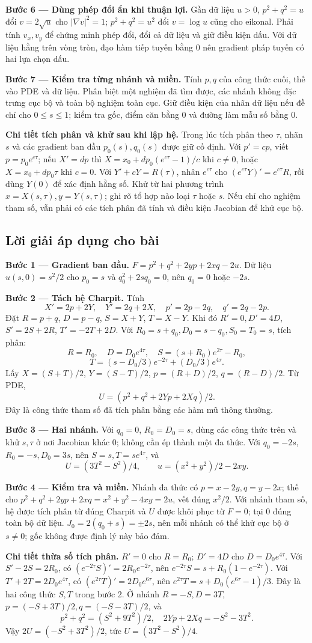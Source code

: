 \documentclass[10pt,a4paper]{article}
\begin{document}
\textbf{Bước 6 — Dùng phép đổi ẩn khi thuận lợi.} Gần dữ liệu $u>0$, $p^2+q^2=u$ đổi $v=2\sqrt u$ cho $|\nabla v|^2=1$; $p^2+q^2=u^2$ đổi $v=\log u$ cũng cho eikonal. Phải tính $v_x,v_y$ để chứng minh phép đổi, đổi cả dữ liệu và giữ điều kiện dấu. Với dữ liệu hằng trên vòng tròn, đạo hàm tiếp tuyến bằng 0 nên gradient pháp tuyến có hai lựa chọn dấu.

\textbf{Bước 7 — Kiểm tra từng nhánh và miền.} Tính $p,q$ của công thức cuối, thế vào PDE và dữ liệu. Phân biệt một nghiệm đã tìm được, các nhánh không đặc trưng cục bộ và toàn bộ nghiệm toàn cục. Giữ điều kiện của nhãn dữ liệu nếu đề chỉ cho $0\le s\le1$; kiểm tra gốc, điểm căn bằng 0 và đường làm mẫu số bằng 0.

\textbf{Chi tiết tích phân và khử sau khi lập hệ.} Trong lúc tích phân theo $\tau$, nhãn $s$ và các gradient ban đầu $p_0(s),q_0(s)$ được giữ cố định. Với $p'=cp$, viết $p=p_0e^{c\tau}$; nếu $X'=dp$ thì $X=x_0+dp_0(e^{c\tau}-1)/c$ khi $c\ne0$, hoặc $X=x_0+dp_0\tau$ khi $c=0$. Với $Y'+cY=R(\tau)$, nhân $e^{c\tau}$ cho $(e^{c\tau}Y)'=e^{c\tau}R$, rồi dùng $Y(0)$ để xác định hằng số. Khử từ hai phương trình $x=X(s,\tau),y=Y(s,\tau)$; ghi rõ tổ hợp nào loại $\tau$ hoặc $s$. Nếu chỉ cho nghiệm tham số, vẫn phải có các tích phân đã tính và điều kiện Jacobian để khử cục bộ.
\subsection*{Lời giải áp dụng cho bài}
\textbf{Bước 1 — Gradient ban đầu.} $F=p^2+q^2+2yp+2xq-2u$. Dữ liệu $u(s,0)=s^2/2$ cho $p_0=s$ và $q_0^2+2sq_0=0$, nên $q_0=0$ hoặc $-2s$.

\textbf{Bước 2 — Tách hệ Charpit.} Tính
\[X'=2p+2Y,\quad Y'=2q+2X,\quad p'=2p-2q,\quad q'=2q-2p.\]
Đặt $R=p+q$, $D=p-q$, $S=X+Y$, $T=X-Y$. Khi đó $R'=0,D'=4D$, $S'=2S+2R$, $T'=-2T+2D$. Với $R_0=s+q_0,D_0=s-q_0,S_0=T_0=s$, tích phân:
\[R=R_0,\quad D=D_0e^{4\tau},\quad S=(s+R_0)e^{2\tau}-R_0,\]
\[T=(s-D_0/3)e^{-2\tau}+(D_0/3)e^{4\tau}.\]
Lấy $X=(S+T)/2$, $Y=(S-T)/2$, $p=(R+D)/2$, $q=(R-D)/2$. Từ PDE,
\[U=(p^2+q^2+2Yp+2Xq)/2.\]
Đây là công thức tham số đã tích phân bằng các hàm mũ thông thường.

\textbf{Bước 3 — Hai nhánh.} Với $q_0=0$, $R_0=D_0=s$, dùng các công thức trên và khử $s,\tau$ ở nơi Jacobian khác 0; không cần ép thành một đa thức. Với $q_0=-2s$, $R_0=-s,D_0=3s$, nên $S=s,T=se^{4\tau}$, và
\[U=(3T^2-S^2)/4,\qquad u=(x^2+y^2)/2-2xy.\]

\textbf{Bước 4 — Kiểm tra và miền.} Nhánh đa thức có $p=x-2y,q=y-2x$; thế cho $p^2+q^2+2yp+2xq=x^2+y^2-4xy=2u$, vết đúng $x^2/2$. Với nhánh tham số, hệ được tích phân từ đúng Charpit và $U$ được khôi phục từ $F=0$; tại 0 đúng toàn bộ dữ liệu. $J_0=2(q_0+s)=\pm2s$, nên mỗi nhánh có thể khử cục bộ ở $s\ne0$; gốc không được định lý này bảo đảm.

\textbf{Chi tiết thừa số tích phân.} $R'=0$ cho $R=R_0$; $D'=4D$ cho $D=D_0e^{4\tau}$. Với $S'-2S=2R_0$, có $(e^{-2\tau}S)'=2R_0e^{-2\tau}$, nên $e^{-2\tau}S=s+R_0(1-e^{-2\tau})$. Với $T'+2T=2D_0e^{4\tau}$, có $(e^{2\tau}T)'=2D_0e^{6\tau}$, nên $e^{2\tau}T=s+D_0(e^{6\tau}-1)/3$. Đây là hai công thức $S,T$ trong bước 2. Ở nhánh $R=-S,D=3T$, $p=(-S+3T)/2,q=(-S-3T)/2$, và
\[p^2+q^2=(S^2+9T^2)/2,\quad 2Yp+2Xq=-S^2-3T^2.\]
Vậy $2U=(-S^2+3T^2)/2$, tức $U=(3T^2-S^2)/4$.
\end{document}
